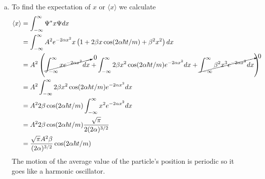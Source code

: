 \documentclass[11pt]{article}
\numberwithin{equation}{section}
\begin{document}
\begin{enumerate}[(a)]
\item
To find the expectation of $x$ or $\langle x\rangle$ we calculate 
\begin{align*}
\langle x\rangle &= \int_{-\infty}^{\infty}\Psi^*x\Psi dx\\
&=\int^{\infty}_{-\infty}A^2e^{-2\alpha x^2}x\left(1+2\beta x\cos(2\alpha\hbar t/m)+\beta^2 x^2\right)dx\\
&= A^2\left(\cancelto{0}{\int^{\infty}_{-\infty}xe^{-2\alpha x^2}dx} + \int^{\infty}_{-\infty}2\beta x^2\cos(2\alpha\hbar t/m)e^{-2\alpha x^2}dx + \cancelto{0}{\int^{\infty}_{-\infty}\beta^2 x^3e^{-2\alpha x^2}dx}\right)\\
&= A^2\int^{\infty}_{-\infty}2\beta x^2\cos(2\alpha\hbar t/m)e^{-2\alpha x^2}dx\\
&= A^22\beta\cos(2\alpha\hbar t/m)\int^{\infty}_{-\infty} x^2e^{-2\alpha x^2}dx\\
&= A^22\beta\cos(2\alpha\hbar t/m)\frac{\sqrt{\pi}}{2(2\alpha)^{3/2}}\\
&= \frac{\sqrt{\pi}A^2\beta}{(2\alpha)^{3/2}}\cos(2\alpha\hbar t/m)
\end{align*}
The motion of the average value of the particle's position is periodic so it goes like a harmonic oscillator.
\end{enumerate}
\end{document}
